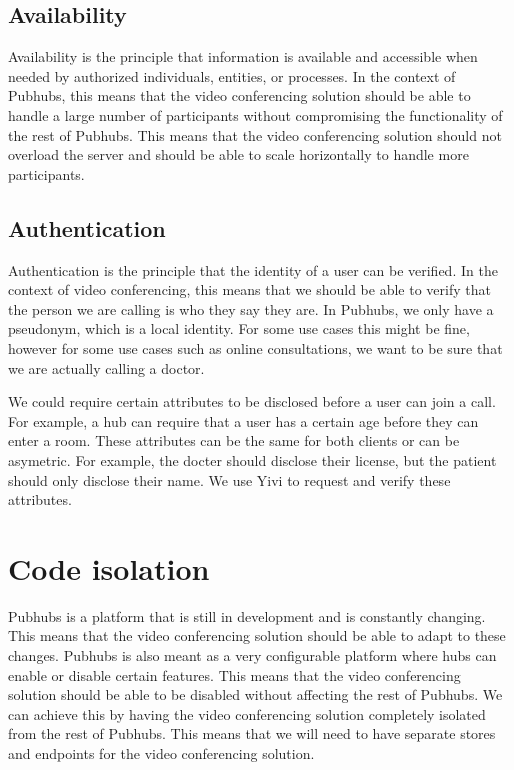 \documentclass{report}
\begin{document}
\subsection{Availability}
Availability is the principle that information is available and accessible when needed by authorized individuals,
entities, or processes. In the context of Pubhubs, this means that the video conferencing solution should be able to
handle a large number of participants without compromising the functionality of the rest of Pubhubs. This means that
the video conferencing solution should not overload the server and should be able to scale horizontally to handle
more participants.

\subsection{Authentication}
Authentication is the principle that the identity of a user can be verified. In the context of video conferencing,
this means that we should be able to verify that the person we are calling is who they say they are. In Pubhubs, we
only have a pseudonym, which is a local identity. For some use cases this might be fine, however for some use cases
such as online consultations, we want to be sure that we are actually calling a doctor.

We could require certain attributes to be disclosed before a user can join a call. For example, a hub
can require that a user has a certain age before they can enter a room. These attributes can be the same for both
clients or can be asymetric. For example, the docter should disclose their license, but the patient should only
disclose their name. We use Yivi to request and verify these attributes.

\section{Code isolation}
Pubhubs is a platform that is still in development and is constantly changing. This means that the video
conferencing solution should be able to adapt to these changes. Pubhubs is also meant as a very configurable platform
where hubs can enable or disable certain features. This means that the video conferencing solution should be able to
be disabled without affecting the rest of Pubhubs. We can achieve this by having the video conferencing solution
completely isolated from the rest of Pubhubs. This means that we will need to have separate stores and endpoints for
the video conferencing solution.
\end{document}
